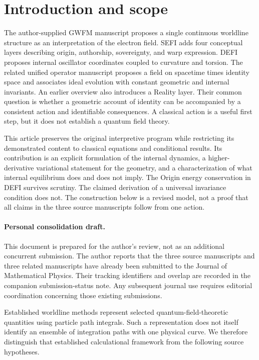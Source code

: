 \documentclass[aip,jmp,reprint,onecolumn,amsmath,amssymb]{revtex4-2}
\begin{document}
\section{Introduction and scope}
The author-supplied GWFM manuscript proposes a single continuous worldline structure as an interpretation of the electron field.\cite{gwfm} SEFI adds four conceptual layers describing origin, authorship, sovereignty, and warp expression.\cite{sefi} DEFI proposes internal oscillator coordinates coupled to curvature and torsion.\cite{defi} The related unified operator manuscript proposes a field on spacetime times identity space and associates ideal evolution with constant geometric and internal invariants.\cite{unified} An earlier overview also introduces a Reality layer.\cite{overview} Their common question is whether a geometric account of identity can be accompanied by a consistent action and identifiable consequences. A classical action is a useful first step, but it does not establish a quantum field theory.

This article preserves the original interpretive program while restricting its demonstrated content to classical equations and conditional results. Its contribution is an explicit formulation of the internal dynamics, a higher-derivative variational statement for the geometry, and a characterization of what internal equilibrium does and does not imply. The Origin energy conservation in DEFI survives scrutiny. The claimed derivation of a universal invariance condition does not. The construction below is a revised model, not a proof that all claims in the three source manuscripts follow from one action.

\paragraph{Personal consolidation draft.} This document is prepared for the author's review, not as an additional concurrent submission. The author reports that the three source manuscripts and three related manuscripts have already been submitted to the Journal of Mathematical Physics. Their tracking identifiers and overlap are recorded in the companion submission-status note. Any subsequent journal use requires editorial coordination concerning those existing submissions.

Established worldline methods represent selected quantum-field-theoretic quantities using particle path integrals.\cite{strassler,schubert} Such a representation does not itself identify an ensemble of integration paths with one physical curve. We therefore distinguish that established calculational framework from the following source hypotheses.
\end{document}
